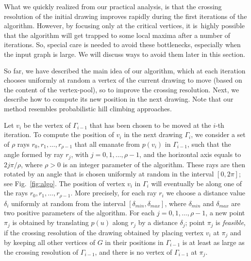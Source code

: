 \documentclass[runningheads]{llncs}
\begin{document}
What we quickly realized from our practical analysis, is that the crossing resolution of the initial drawing improves rapidly during the first iterations of the algorithm. However, by focusing only at the critical vertices, it is~highly possible that the algorithm will get trapped to some local maxima after a number of iterations. So, special care is needed to avoid these bottlenecks, especially when the input graph is large. We will discuss ways to avoid them later in this section.

So far, we have described the main idea of our algorithm, which at each iteration chooses uniformly at random a vertex of the current drawing to move (based on the content of the vertex-pool), so to improve the crossing resolution. Next, we describe how to compute its new position in the next drawing. Note that our method resembles probabilistic hill climbing approaches.

Let $v_i$ be the vertex of $\Gamma_{i-1}$ that has been chosen to be moved at the $i$-th iteration.
To compute the position of $v_i$ in the next drawing $\Gamma_i$, we consider a set of $\rho$ rays $r_0,r_1,\ldots,r_{\rho-1}$ that all emanate from $p(v_i)$ in $\Gamma_{i-1}$, such that the angle formed by ray $r_j$, with $j=0,1,\ldots,\rho-1$, and the horizontal axis equals to $2j\pi/\rho$, where $\rho>0$ is an integer parameter of the algorithm. These rays are then rotated by an angle that is chosen uniformly at random in the interval $[0,2\pi]$; see Fig.~\ref{fig:algo}. The position of vertex $v_i$ in $\Gamma_i$ will eventually be along one of the rays $r_0,r_1,\ldots,r_{\rho-1}$. More precisely, for each ray $r_i$ we choose a distance value $\delta_i$ uniformly at random from the interval $[\delta_{min},\delta_{max}]$, where $\delta_{min}$ and $\delta_{max}$ are two positive parameters of the algorithm. For each $j=0,1,\ldots,\rho-1$, a new point $\pi_j$ is obtained by translating $p(u)$ along $r_j$ by a distance $\delta_j$; point $\pi_j$ is \emph{feasible}, if the crossing resolution of the drawing obtained by placing vertex $v_i$ at $\pi_j$ and by keeping all other vertices of $G$ in their positions in $\Gamma_{i-1}$ is at least as large as the crossing resolution of $\Gamma_{i-1}$, and there is no vertex of $\Gamma_{i-1}$ at $\pi_j$.
\end{document}
